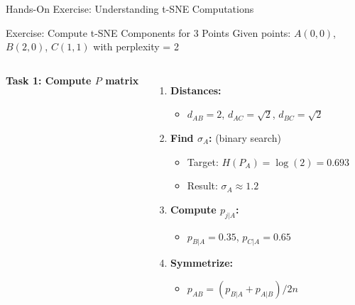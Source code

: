 \documentclass[aspectratio=169]{beamer}
\begin{document}
\begin{frame}{Hands-On Exercise: Understanding t-SNE Computations}

\begin{block}{Exercise: Compute t-SNE Components for 3 Points}
Given points: $A(0,0)$, $B(2,0)$, $C(1,1)$ with perplexity = 2
\end{block}

\begin{columns}
\textbf{Task 1: Compute $P$ matrix}
\begin{enumerate}
\footnotesize
\item \textbf{Distances:}
    \begin{itemize}
    \footnotesize
    \item $d_{AB} = 2$, $d_{AC} = \sqrt{2}$, $d_{BC} = \sqrt{2}$
    \end{itemize}
\item \textbf{Find $\sigma_A$:} (binary search)
    \begin{itemize}
    \footnotesize
    \item Target: $H(P_A) = \log(2) = 0.693$
    \item Result: $\sigma_A \approx 1.2$
    \end{itemize}
\item \textbf{Compute $p_{j|A}$:}
    \begin{itemize}
    \footnotesize
    \item $p_{B|A} = 0.35$, $p_{C|A} = 0.65$
    \end{itemize}
\item \textbf{Symmetrize:}
    \begin{itemize}
    \footnotesize
    \item $p_{AB} = (p_{B|A} + p_{A|B})/2n$
    \end{itemize}
\end{enumerate}


\end{columns}
\end{frame}
\end{document}
